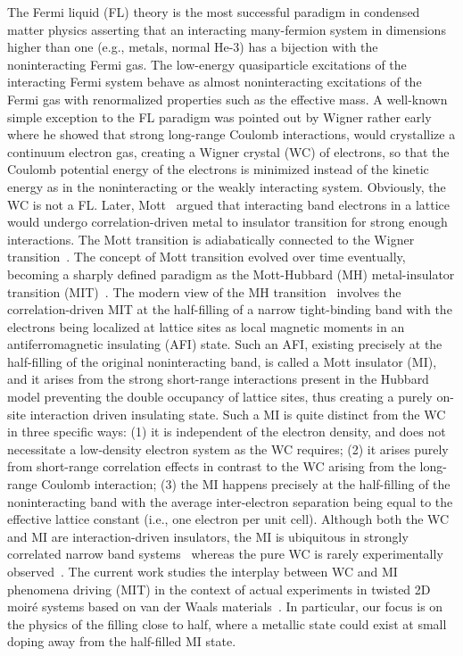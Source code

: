 \documentclass[aps,prl,floatfix,twocolumn]{revtex4-2}
\begin{document}
The Fermi liquid {(FL)} theory is the most successful paradigm in condensed matter physics asserting that an interacting many-fermion system in dimensions higher than one (e.g., metals, normal He-3) has a {bijection} with the noninteracting Fermi gas. The low-energy quasiparticle excitations of the interacting Fermi system behave as almost noninteracting excitations of the Fermi gas with renormalized properties such as the effective mass.  A well-known simple exception to the {FL} paradigm was pointed out by Wigner rather early~\cite{wigner1934interaction} where he showed that strong long-range Coulomb interactions, would crystallize a continuum electron gas, creating a Wigner crystal (WC) of electrons, so that the Coulomb potential energy of the electrons is minimized instead of the kinetic energy as in the noninteracting or the weakly interacting system.  Obviously, the WC is not a {FL}. Later, Mott~\cite{mott1949basis} argued that interacting band electrons in a lattice would undergo correlation-driven metal to insulator transition for strong enough interactions. The Mott transition is adiabatically connected to the Wigner transition~\cite{kohn1967mott,vu2020collective}. The concept of Mott transition evolved over time eventually, becoming a sharply defined paradigm as the Mott-Hubbard (MH) metal-insulator transition {(MIT)}~\cite{hubbard1963electron}. The modern view of the MH transition~\cite{mott1968metalinsulator,gebhard1997mott,mott2004metalinsulator} involves the correlation-driven {MIT} at the half-filling of a narrow tight-binding band with the electrons being localized at lattice sites as local magnetic moments in an antiferromagnetic insulating (AFI) state.  Such an AFI, existing precisely at the half-filling of the original noninteracting band, is called a Mott insulator (MI), and it arises from the strong short-range interactions present in the Hubbard model preventing the double occupancy of lattice sites, thus creating a purely on-site interaction driven insulating state.  Such a MI is quite distinct from the WC in three specific ways: (1) it is independent of the electron density, and does not necessitate a low-density electron system as the WC requires; (2) it arises purely from short-range correlation effects in contrast to the WC arising from the long-range Coulomb interaction; (3) the MI happens precisely at the half-filling of the noninteracting band with the average inter-electron separation being equal to the effective lattice constant (i.e., one electron per unit cell).  Although both the WC and MI are interaction-driven insulators, the MI is ubiquitous in strongly correlated narrow band systems~\cite{imada1998metalinsulator} whereas the pure WC is rarely experimentally observed~\cite{grimes1979evidence}. The current work studies the interplay between WC and MI phenomena driving {(MIT)} in the context of actual experiments in twisted 2D moir\'e systems based on van der Waals materials~\cite{wang2020correlated,regan2020mott,zhang2020flat,tang2020simulation,xu2020correlated,huang2021correlated,jin2021stripe,cao2018unconventional,cao2018correlated,yankowitz2019tuning,lu2019superconductors}. In particular, our focus is on the physics of the filling close to half, where a metallic state could exist at small doping away from the half-filled MI state.  
\end{document}
